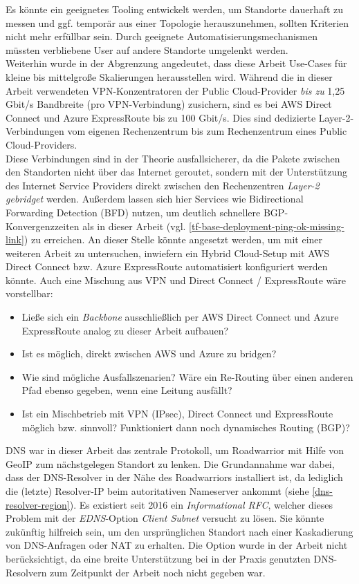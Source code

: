 Es könnte ein geeignetes Tooling entwickelt werden, um Standorte dauerhaft zu messen und ggf. temporär aus einer Topologie herauszunehmen, sollten Kriterien nicht mehr erfüllbar sein. Durch geeignete Automatisierungsmechanismen müssten verbliebene User auf andere Standorte \glqq umgelenkt\grqq{} werden.\\
Weiterhin wurde in der Abgrenzung angedeutet, dass diese Arbeit Use-Cases für kleine bis mittelgroße Skalierungen herausstellen wird. Während die in dieser Arbeit verwendeten VPN-Konzentratoren der Public Cloud-Provider \textit{bis zu} 1,25 Gbit/s Bandbreite (pro VPN-Verbindung) zusichern, sind es bei AWS Direct Connect \cite{awsdc2020} und Azure ExpressRoute \cite{Washam2014} bis zu 100 Gbit/s. Dies sind dedizierte Layer-2-Verbindungen vom eigenen Rechenzentrum bis zum Rechenzentrum eines Public Cloud-Providers.\\
Diese Verbindungen sind in der Theorie ausfallsicherer, da die Pakete zwischen den Standorten nicht über das Internet geroutet, sondern mit der Unterstützung des Internet Service Providers direkt zwischen den Rechenzentren \textit{Layer-2 gebridget} werden. Außerdem lassen sich hier Services wie Bidirectional Forwarding Detection (BFD) nutzen, um deutlich schnellere BGP-Konvergenzzeiten als in dieser Arbeit (vgl. \ref{tf-base-deployment-ping-ok-missing-link}) zu erreichen\cite{azurebfd2018}.
An dieser Stelle könnte angesetzt werden, um mit einer weiteren Arbeit zu untersuchen, inwiefern ein Hybrid Cloud-Setup mit AWS Direct Connect bzw. Azure ExpressRoute automatisiert konfiguriert werden könnte. Auch eine Mischung aus VPN und Direct Connect / ExpressRoute wäre vorstellbar:
\begin{itemize}
    \item Ließe sich ein \textit{Backbone} ausschließlich per AWS Direct Connect und Azure ExpressRoute analog zu dieser Arbeit aufbauen?
    \item Ist es möglich, direkt zwischen AWS und Azure zu bridgen?
    \item Wie sind mögliche Ausfallszenarien? Wäre ein Re-Routing über einen anderen Pfad ebenso gegeben, wenn eine Leitung ausfällt?
    \item Ist ein Mischbetrieb mit VPN (IPsec), Direct Connect und ExpressRoute möglich bzw. sinnvoll? Funktioniert dann noch dynamisches Routing (BGP)?
\end{itemize}
DNS war in dieser Arbeit das zentrale Protokoll, um Roadwarrior mit Hilfe von GeoIP zum nächstgelegen Standort zu lenken. Die Grundannahme war dabei, dass der DNS-Resolver in der Nähe des Roadwarriors installiert ist, da lediglich die (letzte) Resolver-IP beim autoritativen Nameserver ankommt (siehe \ref{dns-resolver-region}). Es existiert seit 2016 ein \textit{Informational RFC}, welcher dieses Problem mit der \textit{EDNS}-Option \textit{Client Subnet} versucht zu lösen\cite{rfc7871}. Sie könnte zukünftig hilfreich sein, um den ursprünglichen Standort nach einer Kaskadierung von DNS-Anfragen oder NAT zu erhalten. Die Option wurde in der Arbeit nicht berücksichtigt, da eine breite Unterstützung bei in der Praxis genutzten DNS-Resolvern zum Zeitpunkt der Arbeit noch nicht gegeben war.\\ 
